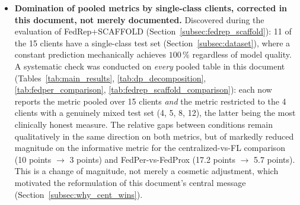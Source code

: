 \documentclass{article}
\begin{document}
\begin{itemize}
  same-sign pairs, not doubtful significance.
  \item \textbf{Domination of pooled metrics by single-class clients, corrected
  in this document, not merely documented.} Discovered during the evaluation of
  FedRep+SCAFFOLD (Section~\ref{subsec:fedrep_scaffold}): 11 of the 15 clients
  have a single-class test set (Section~\ref{subsec:dataset}), where a constant
  prediction mechanically achieves $100\,\%$ regardless of model quality. A
  systematic check was conducted on \emph{every} pooled table in this document
  (Tables~\ref{tab:main_results}, \ref{tab:dp_decomposition},
  \ref{tab:fedper_comparison}, \ref{tab:fedrep_scaffold_comparison}): each now
  reports the metric pooled over 15 clients \emph{and} the metric restricted to
  the 4 clients with a genuinely mixed test set (4, 5, 8, 12), the latter being
  the most clinically honest measure. The relative gaps between conditions
  remain qualitatively in the same direction on both metrics, but of markedly
  reduced magnitude on the informative metric for the centralized-vs-FL
  comparison (10 points $\to$ 3 points) and FedPer-vs-FedProx (17.2 points
  $\to$ 5.7 points). This is a change of magnitude, not merely a cosmetic
  adjustment, which motivated the reformulation of this document's central
  message (Section~\ref{subsec:why_cent_wins}).
\end{itemize}

\printbibliography
\end{document}
